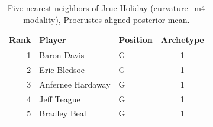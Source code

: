\begin{table}[htbp]
  \centering\small
  \begin{tabular}{rllc}
    \toprule
    Rank & Player & Position & Archetype \\
    \midrule
    1 & Baron Davis & G & 1 \\
    2 & Eric Bledsoe & G & 1 \\
    3 & Anfernee Hardaway & G & 1 \\
    4 & Jeff Teague & G & 1 \\
    5 & Bradley Beal & G & 1 \\
    \bottomrule
  \end{tabular}
  \caption{Five nearest neighbors of Jrue Holiday (curvature_m4 modality), Procrustes-aligned posterior mean.}
  \label{tab:Jrue_Holiday_neighbors_curvature_m4}
\end{table}

